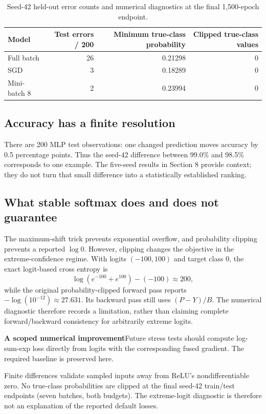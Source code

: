 \documentclass[10pt,a4paper]{article}
\newcommand{\finding}[2]{\begin{tcolorbox}\textbf{\textcolor{clay}{#1}}\quad #2\end{tcolorbox}}
\begin{document}
\begin{table}[H]\small\centering
\caption{Seed-42 held-out error counts and numerical diagnostics at the final 1,500-epoch endpoint.}
\begin{tabular}{@{}lrrr@{}}\toprule
Model & Test errors / 200 & Minimum true-class probability & Clipped true-class values\\\midrule
Full batch & 26 & 0.21298 & 0\\
SGD & 3 & 0.18289 & 0\\
Mini-batch 8 & 2 & 0.23994 & 0\\
\bottomrule\end{tabular}\end{table}

\subsection{Accuracy has a finite resolution}
There are 200 MLP test observations: one changed prediction moves accuracy
by 0.5 percentage points. Thus the seed-42 difference between 99.0\% and
98.5\% corresponds to one example. The five-seed results in Section 8 provide
context; they do not turn that small difference into a statistically
established ranking.

\subsection{What stable softmax does and does not guarantee}
The maximum-shift trick prevents exponential overflow, and probability
clipping prevents a reported $\log 0$. However, clipping changes the objective
in the extreme-confidence regime. With logits $(-100,100)$ and target
class 0, the exact logit-based cross entropy is
\[
 \log(e^{-100}+e^{100})-(-100)\approx200,
\]
while the original probability-clipped forward pass reports
$-\log(10^{-12})\approx27.631$. Its backward pass still uses $(P-Y)/B$.
The numerical diagnostic therefore records a limitation, rather than
claiming complete forward/backward consistency for arbitrarily extreme logits.

\finding{A scoped numerical improvement}{Future stress tests should compute
log-sum-exp loss directly from logits with the corresponding fused gradient.
The required baseline is preserved here.}

Finite differences validate sampled inputs away from ReLU's nondifferentiable
zero. No true-class probabilities are clipped at the final seed-42 train/test
endpoints (seven batches, both budgets). The extreme-logit diagnostic is
therefore not an explanation of the reported default losses.
\end{document}
